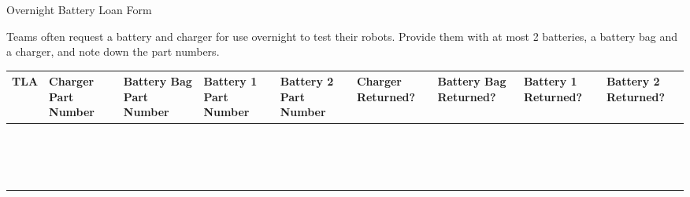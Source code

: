 \documentclass[a4paper, 12pt, landscape]{article}
\begin{document}
\begin{center}

    {\huge{Overnight Battery Loan Form}}

\end{center}

Teams often request a battery and charger for use overnight to test their robots. Provide them with at most 2 batteries, a battery bag and a charger, and note down the part numbers.

\begin{center}
\begin{table}[h]
\def\arraystretch{1.5}
\begin{tabularx}{\textwidth}{|Y|Y|Y|Y|Y|Y|Y|Y|Y|}
    \textbf{TLA} &
    \textbf{Charger Part Number} &
    \textbf{Battery Bag Part Number} &
    \textbf{Battery 1 Part Number} &
    \textbf{Battery 2 Part Number} &
    \textbf{Charger Returned?} &
    \textbf{Battery Bag Returned?} &
    \textbf{Battery 1 Returned?} &
    \textbf{Battery 2 Returned?} \\
\hline
\large
& & & & & & & & \\ \hline
& & & & & & & & \\ \hline
& & & & & & & & \\ \hline
& & & & & & & & \\ \hline
& & & & & & & & \\ \hline
& & & & & & & & \\ \hline
& & & & & & & & \\ \hline
& & & & & & & & \\ \hline
& & & & & & & & \\ \hline
& & & & & & & & \\ \hline
& & & & & & & & \\ \hline
& & & & & & & & \\ \hline
& & & & & & & & \\ \hline
& & & & & & & & \\ \hline
& & & & & & & & \\ \hline
& & & & & & & & \\ \hline
\end{tabularx}
\end{table}
\end{center}
\end{document}
